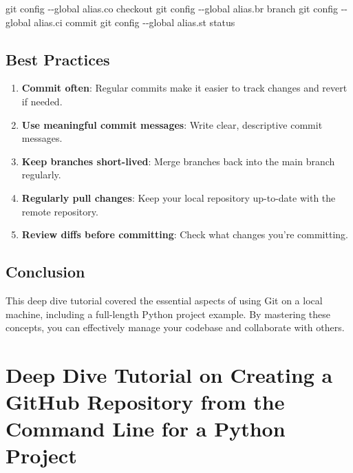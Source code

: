 \documentclass[
  letterpaper,
  DIV=11,
  numbers=noendperiod]{scrreprt}
\newenvironment{Shaded}{\begin{snugshade}}{\end{snugshade}}
\newcommand{\AttributeTok}[1]{\textcolor[rgb]{0.40,0.45,0.13}{#1}}
\newcommand{\FunctionTok}[1]{\textcolor[rgb]{0.28,0.35,0.67}{#1}}
\newcommand{\NormalTok}[1]{\textcolor[rgb]{0.00,0.23,0.31}{#1}}
\providecommand{\tightlist}{%
  \setlength{\itemsep}{0pt}\setlength{\parskip}{0pt}}\usepackage{longtable,booktabs,array}
\begin{document}
\begin{Shaded}
\begin{Highlighting}[]
\FunctionTok{git}\NormalTok{ config }\AttributeTok{{-}{-}global}\NormalTok{ alias.co checkout}
\FunctionTok{git}\NormalTok{ config }\AttributeTok{{-}{-}global}\NormalTok{ alias.br branch}
\FunctionTok{git}\NormalTok{ config }\AttributeTok{{-}{-}global}\NormalTok{ alias.ci commit}
\FunctionTok{git}\NormalTok{ config }\AttributeTok{{-}{-}global}\NormalTok{ alias.st status}
\end{Highlighting}
\end{Shaded}

\section{Best Practices}\label{best-practices-14}

\begin{enumerate}
\def\labelenumi{\arabic{enumi}.}
\tightlist
\item
  \textbf{Commit often}: Regular commits make it easier to track changes
  and revert if needed.
\item
  \textbf{Use meaningful commit messages}: Write clear, descriptive
  commit messages.
\item
  \textbf{Keep branches short-lived}: Merge branches back into the main
  branch regularly.
\item
  \textbf{Regularly pull changes}: Keep your local repository up-to-date
  with the remote repository.
\item
  \textbf{Review diffs before committing}: Check what changes you're
  committing.
\end{enumerate}

\section{Conclusion}\label{conclusion-57}

This deep dive tutorial covered the essential aspects of using Git on a
local machine, including a full-length Python project example. By
mastering these concepts, you can effectively manage your codebase and
collaborate with others.


\chapter{Deep Dive Tutorial on Creating a GitHub Repository from the
Command Line for a Python
Project}\label{deep-dive-tutorial-on-creating-a-github-repository-from-the-command-line-for-a-python-project}
\end{document}
